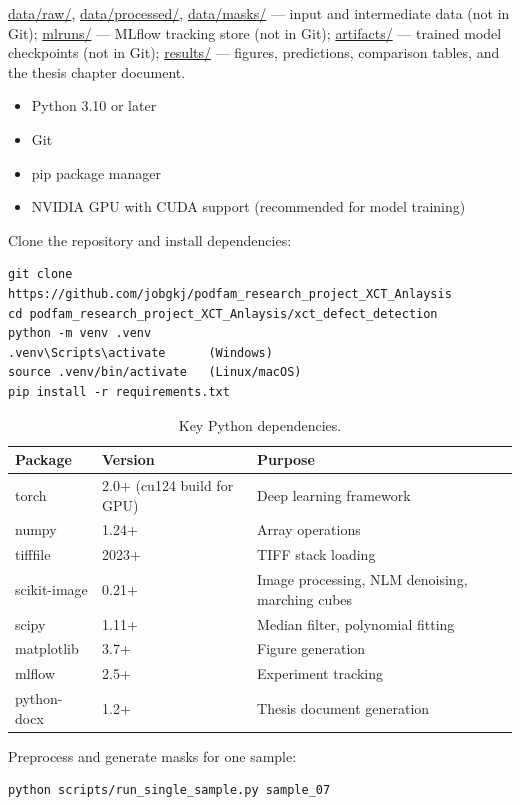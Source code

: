 \url{data/raw/}, \url{data/processed/}, \url{data/masks/} --- input and intermediate data
(not in Git); \url{mlruns/} --- MLflow tracking store (not in Git); \url{artifacts/} --- trained
model checkpoints (not in Git); \url{results/} --- figures, predictions, comparison tables, and
the thesis chapter document.

\begin{itemize}
\item Python 3.10 or later
\item Git
\item pip package manager
\item NVIDIA GPU with CUDA support (recommended for model training)
\end{itemize}

Clone the repository and install dependencies:
\begin{verbatim}
git clone https://github.com/jobgkj/podfam_research_project_XCT_Anlaysis
cd podfam_research_project_XCT_Anlaysis/xct_defect_detection
python -m venv .venv
.venv\Scripts\activate      (Windows)
source .venv/bin/activate   (Linux/macOS)
pip install -r requirements.txt
\end{verbatim}

\begin{table}[htbp]
\centering
\caption{Key Python dependencies.}
\begin{tabular}{p{3.2cm}p{4.4cm}p{5.6cm}}
\toprule
\textbf{Package} & \textbf{Version} & \textbf{Purpose} \\
\midrule
torch & 2.0+ (cu124 build for GPU) & Deep learning framework \\
numpy & 1.24+ & Array operations \\
tifffile & 2023+ & TIFF stack loading \\
scikit-image & 0.21+ & Image processing, NLM denoising, marching cubes \\
scipy & 1.11+ & Median filter, polynomial fitting \\
matplotlib & 3.7+ & Figure generation \\
mlflow & 2.5+ & Experiment tracking \\
python-docx & 1.2+ & Thesis document generation \\
\bottomrule
\end{tabular}
\end{table}

Preprocess and generate masks for one sample:
\begin{verbatim}
python scripts/run_single_sample.py sample_07
\end{verbatim}

